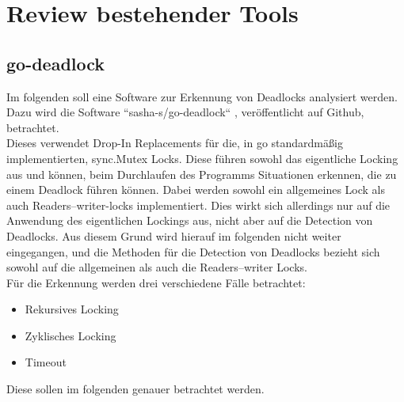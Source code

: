 \chapter{Review bestehender Tools}
\section{go-deadlock}\label{Chap::Review:go-deadlock}
Im folgenden soll eine Software zur Erkennung von Deadlocks analysiert werden.
Dazu wird die Software ``sasha-s/go-deadlock`` \cite{sasha-s}, veröffentlicht 
auf Github, betrachtet.\\
Dieses verwendet Drop-In Replacements für die, in go standardmäßig 
implementierten, sync.Mutex Locks. Diese führen sowohl das eigentliche 
Locking aus und können, beim Durchlaufen des Programms Situationen erkennen, 
die zu einem Deadlock führen können. Dabei werden sowohl ein allgemeines Lock 
als auch Readers–writer-locks implementiert. Dies wirkt sich allerdings nur auf
die Anwendung des eigentlichen Lockings aus, nicht aber auf die Detection von 
Deadlocks. Aus diesem Grund wird hierauf im folgenden nicht weiter eingegangen, 
und die Methoden für die Detection von Deadlocks bezieht sich sowohl auf die
allgemeinen als auch die Readers–writer Locks.\\
Für die Erkennung werden drei verschiedene Fälle betrachtet:
\begin{itemize}
    \item Rekursives Locking
    \item Zyklisches Locking
    \item Timeout
\end{itemize}
Diese sollen im folgenden genauer betrachtet werden.

